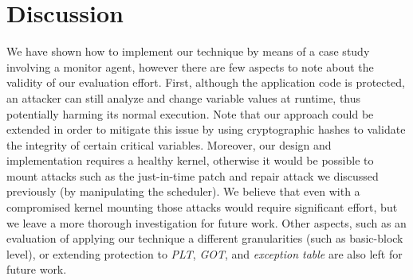 \section{Discussion}
\label{sec:discussion_packing}

We have shown how to implement our technique by means of a case study involving 
a monitor agent, however there are few aspects to note about the validity of 
our evaluation effort.
First, although the application code is protected, 
an attacker can still analyze and change variable values at runtime, thus 
potentially harming its normal execution.
Note that our approach could be extended in order to mitigate this issue by 
using cryptographic hashes to validate the integrity of certain critical 
variables.
Moreover, our design and implementation requires a healthy kernel, otherwise it 
would be possible to mount attacks such as the just-in-time patch and repair 
attack we discussed previously (by manipulating the scheduler). We believe  
that even with a compromised kernel mounting those attacks would require 
significant effort, but we leave a more thorough investigation for future work. 
Other aspects, such as an evaluation of applying our technique a different 
granularities (such as basic-block level), or extending protection to 
\emph{PLT}, \emph{GOT}, and \emph{exception table} are also left for future 
work.

